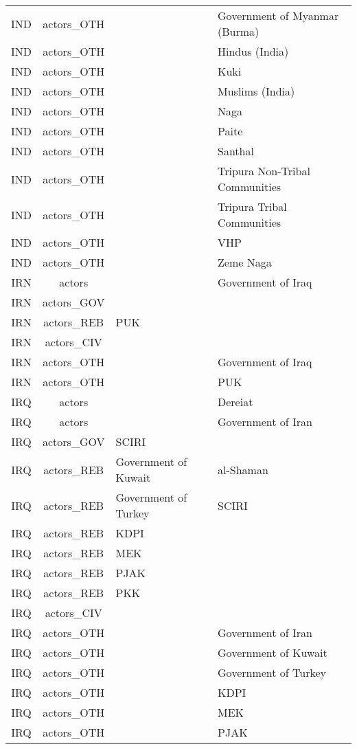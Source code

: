 \documentclass[12pt]{article}
\begin{document}
\begin{center}
\begin{longtable}{|c|c|p{7cm}|p{7cm}|}
  IND & actors\_OTH &  & Government of Myanmar (Burma) \\ 
  IND & actors\_OTH &  & Hindus (India) \\ 
  IND & actors\_OTH &  & Kuki \\ 
  IND & actors\_OTH &  & Muslims (India) \\ 
  IND & actors\_OTH &  & Naga \\ 
  IND & actors\_OTH &  & Paite \\ 
  IND & actors\_OTH &  & Santhal \\ 
  IND & actors\_OTH &  & Tripura Non-Tribal Communities \\ 
  IND & actors\_OTH &  & Tripura Tribal Communities \\ 
  IND & actors\_OTH &  & VHP \\ 
  IND & actors\_OTH &  & Zeme Naga \\ 
  IRN & actors &  & Government of Iraq \\ 
  IRN & actors\_GOV &  &  \\ 
  IRN & actors\_REB & PUK &  \\ 
  IRN & actors\_CIV &  &  \\ 
  IRN & actors\_OTH &  & Government of Iraq \\ 
  IRN & actors\_OTH &  & PUK \\ 
  IRQ & actors &  & Dereiat \\ 
  IRQ & actors &  & Government of Iran \\ 
  IRQ & actors\_GOV & SCIRI &  \\ 
  IRQ & actors\_REB & Government of Kuwait & al-Shaman \\ 
  IRQ & actors\_REB & Government of Turkey & SCIRI \\ 
  IRQ & actors\_REB & KDPI &  \\ 
  IRQ & actors\_REB & MEK &  \\ 
  IRQ & actors\_REB & PJAK &  \\ 
  IRQ & actors\_REB & PKK &  \\ 
  IRQ & actors\_CIV &  &  \\ 
  IRQ & actors\_OTH &  & Government of Iran \\ 
  IRQ & actors\_OTH &  & Government of Kuwait \\ 
  IRQ & actors\_OTH &  & Government of Turkey \\ 
  IRQ & actors\_OTH &  & KDPI \\ 
  IRQ & actors\_OTH &  & MEK \\ 
  IRQ & actors\_OTH &  & PJAK \\ 

\end{longtable}
\end{center}
\end{document}
